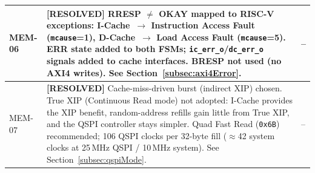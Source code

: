 \begin{table}[H]
\begin{tabularx}{\textwidth}{|l |X |l|}
  \hline
  MEM-06 & \textbf{[RESOLVED]} RRESP $\neq$ OKAY mapped to RISC-V exceptions:
           I-Cache~$\rightarrow$ Instruction Access Fault (\texttt{mcause}=1),
           D-Cache~$\rightarrow$ Load Access Fault (\texttt{mcause}=5).
           ERR state added to both FSMs; \texttt{ic\_err\_o}/\texttt{dc\_err\_o}
           signals added to cache interfaces. BRESP not used (no AXI4 writes).
           See Section~\ref{subsec:axi4Error}. & -- \\
  \hline
  MEM-07 & \textbf{[RESOLVED]} Cache-miss-driven burst (indirect XIP) chosen.
           True XIP (Continuous Read mode) not adopted: I-Cache provides
           the XIP benefit, random-address refills gain little from True XIP,
           and the QSPI controller stays simpler.
           Quad Fast Read (\texttt{0x6B}) recommended; 106 QSPI clocks per
           32-byte fill ($\approx$42 system clocks at 25\,MHz QSPI / 10\,MHz system).
           See Section~\ref{subsec:qspiMode}. & -- \\
  \hline
\end{tabularx}
\end{table}
